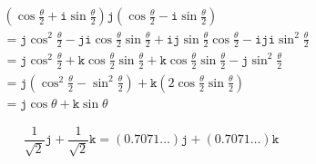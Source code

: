 \documentclass{jlreq}
\newcommand{\ii}{\mathtt{i}}
\newcommand{\jj}{\mathtt{j}}
\newcommand{\kk}{\mathtt{k}}
\begin{document}
\begin{preview}
    \begin{align}
         & \left( \cos \frac{\theta}{2} + \ii \sin \frac{\theta}{2} \right) \jj \left( \cos \frac{\theta}{2} - \ii \sin \frac{\theta}{2} \right)                                           \\
         & = \jj \cos^2 \frac{\theta}{2} - \jj \ii \cos \frac{\theta}{2} \sin \frac{\theta}{2} + \ii \jj \sin \frac{\theta}{2} \cos \frac{\theta}{2} - \ii \jj \ii \sin^2 \frac{\theta}{2} \\
         & = \jj \cos^2 \frac{\theta}{2} + \kk \cos \frac{\theta}{2} \sin \frac{\theta}{2} + \kk \cos \frac{\theta}{2} \sin \frac{\theta}{2} - \jj \sin^2 \frac{\theta}{2}                 \\
         & = \jj \left( \cos^2 \frac{\theta}{2} - \sin^2 \frac{\theta}{2} \right) + \kk \left( 2 \cos \frac{\theta}{2} \sin \frac{\theta}{2} \right)                                       \\
         & = \jj \cos \theta + \kk \sin \theta
    \end{align}
\end{preview}

\begin{preview}
    \begin{equation}
        \frac{1}{\sqrt{2}} \jj + \frac{1}{\sqrt{2}} \kk = (0.7071 \dots) \jj + (0.7071 \dots) \kk
    \end{equation}
\end{preview}
\end{document}
